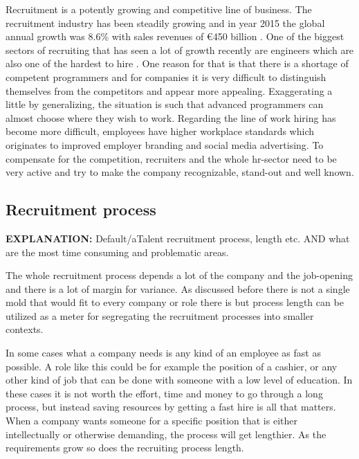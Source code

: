 \documentclass[11pt,a4paper,oneside,article]{memoir}
\begin{document}
Recruitment is a potently growing and competitive line of business. The recruitment industry has been steadily growing and in year 2015 the global annual growth was 8.6\% with sales revenues of €450 billion \cite{ciett:economic}. One of the biggest sectors of recruiting that has seen a lot of growth recently are engineers which are also one of the hardest to hire \cite[p.~7]{wef:jobs} \cite{elliot:blog}. One reason for that is that there is a shortage of competent programmers and for companies it is very difficult to distinguish themselves from the competitors and appear more appealing. Exaggerating a little by generalizing, the situation is such that %
advanced programmers can almost choose where they wish to work. Regarding the line of work hiring has become more difficult, employees have higher workplace standards which originates to improved employer branding and social media advertising. To compensate for the competition, recruiters and the whole \gls{hr}-sector need to be very active and try to make the company recognizable, stand-out and well known.

\subsection{Recruitment process}
\textbf{EXPLANATION:} Default/aTalent recruitment process, length etc. AND what are the most time consuming and problematic areas.

The whole recruitment process depends a lot of the company and the job-opening and there is a lot of margin for variance. As discussed before there is not a single mold that would fit to every company or role there is but process length can be utilized as a meter for segregating the recruitment processes into smaller contexts.

In some cases what a company needs is any kind of an employee as fast as possible. A role like this could be for example the position of a cashier, or any other kind of job that can be done with someone with a low level of education. In these cases it is not worth the effort, time and money to go through a long process, but instead saving resources by getting a fast hire is all that matters. When a company wants someone for a specific position that is either intellectually or otherwise demanding, the process will get lengthier. As the requirements grow so does the recruiting process length.
\end{document}
